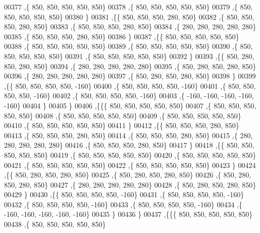 \begin{DoxyCode}
00377    ,\{   850,   850,   850,   850,   850\}
00378    ,\{   850,   850,   850,   850,   850\}
00379    ,\{   850,   850,   850,   850,   850\}
00380    \}
00381   ,\{\{   850,   850,   850,   280,   850\}
00382    ,\{   850,   850,   850,   280,   850\}
00383    ,\{   850,   850,   850,   280,   850\}
00384    ,\{   280,   280,   280,   280,   280\}
00385    ,\{   850,   850,   850,   280,   850\}
00386    \}
00387   ,\{\{   850,   850,   850,   850,   850\}
00388    ,\{   850,   850,   850,   850,   850\}
00389    ,\{   850,   850,   850,   850,   850\}
00390    ,\{   850,   850,   850,   850,   850\}
00391    ,\{   850,   850,   850,   850,   850\}
00392    \}
00393   ,\{\{   850,   280,   850,   280,   850\}
00394    ,\{   280,   280,   280,   280,   280\}
00395    ,\{   850,   280,   850,   280,   850\}
00396    ,\{   280,   280,   280,   280,   280\}
00397    ,\{   850,   280,   850,   280,   850\}
00398    \}
00399   ,\{\{   850,   850,   850,   850,  -160\}
00400    ,\{   850,   850,   850,   850,  -160\}
00401    ,\{   850,   850,   850,   850,  -160\}
00402    ,\{   850,   850,   850,   850,  -160\}
00403    ,\{  -160,  -160,  -160,  -160,  -160\}
00404    \}
00405   \}
00406  ,\{\{\{   850,   850,   850,   850,   850\}
00407    ,\{   850,   850,   850,   850,   850\}
00408    ,\{   850,   850,   850,   850,   850\}
00409    ,\{   850,   850,   850,   850,   850\}
00410    ,\{   850,   850,   850,   850,   850\}
00411    \}
00412   ,\{\{   850,   850,   850,   280,   850\}
00413    ,\{   850,   850,   850,   280,   850\}
00414    ,\{   850,   850,   850,   280,   850\}
00415    ,\{   280,   280,   280,   280,   280\}
00416    ,\{   850,   850,   850,   280,   850\}
00417    \}
00418   ,\{\{   850,   850,   850,   850,   850\}
00419    ,\{   850,   850,   850,   850,   850\}
00420    ,\{   850,   850,   850,   850,   850\}
00421    ,\{   850,   850,   850,   850,   850\}
00422    ,\{   850,   850,   850,   850,   850\}
00423    \}
00424   ,\{\{   850,   280,   850,   280,   850\}
00425    ,\{   850,   280,   850,   280,   850\}
00426    ,\{   850,   280,   850,   280,   850\}
00427    ,\{   280,   280,   280,   280,   280\}
00428    ,\{   850,   280,   850,   280,   850\}
00429    \}
00430   ,\{\{   850,   850,   850,   850,  -160\}
00431    ,\{   850,   850,   850,   850,  -160\}
00432    ,\{   850,   850,   850,   850,  -160\}
00433    ,\{   850,   850,   850,   850,  -160\}
00434    ,\{  -160,  -160,  -160,  -160,  -160\}
00435    \}
00436   \}
00437  ,\{\{\{   850,   850,   850,   850,   850\}
00438    ,\{   850,   850,   850,   850,   850\}

\end{DoxyCode}
